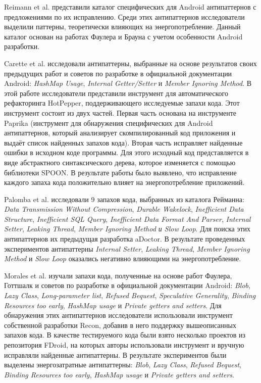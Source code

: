 Reimann et al. \cite{reimann2014tool} представили каталог специфических для Android антипаттернов с предложениями по их исправлению. Среди этих антипаттернов исследователи выделили паттерны, теоретически влияющих на энергопотребление. Данный каталог основан на работах Фаулера и Брауна с учетом особенности Android разработки. 

Carette et al. \cite{carette2017investigating} исследовали антипаттерны, выбранные на основе результатов своих предыдущих работ и советов по разработке в официальной документации Android: \emph{HashMap Usage}, \emph{Internal Getter/Setter} и \emph{Member Ignoring Method}. В этой работе исследователи представили инструмент для автоматического рефакторинга HotPepper, поддерживающего исследуемые запахи кода. Этот инструмент состоит из двух частей. Первая часть основана на инструменте Paprika (инструмент для обнаружения специфических для Android антипаттернов, который анализирует скомпилированный код приложения и выдаёт список найденных запахов кода). Вторая часть исправляет найденные ошибки в исходном коде программы. Для этого исходный код представляется в виде абстрактного синтаксического дерева, которое изменяется с помощью библиотеки SPOON. В результате работы было выявлено, что исправление каждого запаха кода положительно влияет на энергопотребление приложений.

Palomba et al. \cite{palomba2019impact} исследовали 9 запахов кода, выбранных из каталога Рейманна: \emph{Data Transmission Without Compression}, \emph{Durable Wakelock}, \emph{Inefficient Data Structure}, \emph{Inefficient SQL Query}, \emph{Inefficient Data Format And Parser}, \emph{Internal Setter}, \emph{Leaking Thread}, \emph{Member Ignoring Method и Slow Loop}. Для поиска этих антипаттернов их предыдущая разработка aDoctor. В результате проведенных экспериментов антипаттерны \emph{Internal Setter}, \emph{Leaking Thread}, \emph{Member Ignoring Method} и \emph{Slow Loop} оказались негативно влияющими на энергопотребление.

Morales et al. \cite{morales2016anti} изучали запахи кода, полученные на основе работ Фаулера, Готтшалк и советов по разработке в официальной документации Android: \emph{Blob}, \emph{Lazy Class}, \emph{Long-parameter list}, \emph{Refused Bequest}, \emph{Speculative Generality}, \emph{Binding Resources too early}, \emph{HashMap usage} и \emph{Private getters and setters}. Для обнаружения этих антипаттернов исследователи использовали инструмент собственной разработки Recon, добавив в него поддержку вышеописанных запахов кода. В качестве тестируемого кода были взято несколько проектов из репозитория FDroid, на которых авторы использовали инструмент и вручную исправляли найденные антипаттерны. В результате экспериментов были выделены энергозатратные антипаттерны: \emph{Blob}, \emph{Lazy Class},  \emph{Refused Bequest}, \emph{Binding Resources too early}, \emph{HashMap usage} и \emph{Private getters and setters}.

